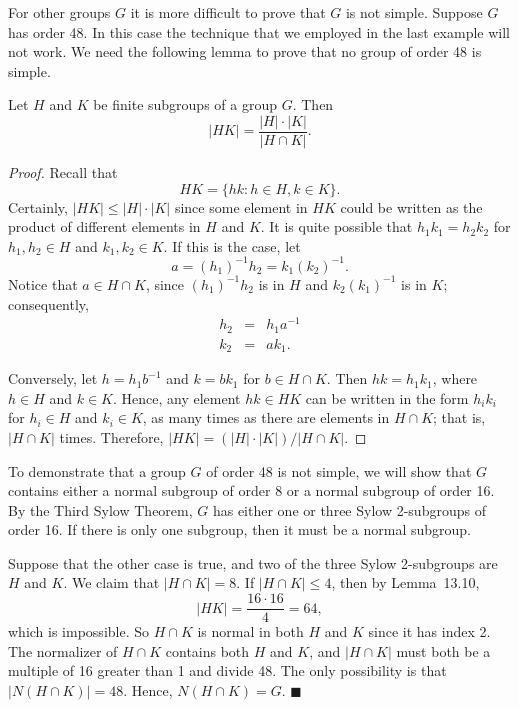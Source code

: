  
\medskip
 
 
For other groups $G$ it is more difficult to prove that $G$ is not
simple. Suppose $G$ has order 48. In this case the technique that we
employed in the last example will not work.  We need the following
lemma to prove that no group of order 48 is simple.  
 
 
\begin{lemma}
Let $H$ and $K$ be finite subgroups of a group $G$. Then
$$
|HK| = \frac{|H| \cdot |K|}{|H \cap K|}.
$$
\end{lemma}
 
 
\begin{proof}
Recall that
$$
HK = \{ hk : h \in H, k \in K \}.
$$
Certainly, $|HK| \leq |H| \cdot |K|$ since some element in $HK$
could be written as the product of different elements in $H$ and $K$.
It is quite possible that $h_1 k_1 = h_2 k_2$ for $h_1, h_2 \in H$ and
$k_1, k_2 \in K$.  If this is the case, let
$$
a = (h_1)^{-1} h_2 = k_1 (k_2)^{-1}.
$$
Notice that $a \in H \cap K$, since $(h_1)^{-1} h_2$ is in $H$ and
$k_2 (k_1)^{-1}$ is in $K$; consequently, 
\begin{eqnarray*}
h_2 & = & h_1 a^{-1} \\
k_2 & = & a k_1.
\end{eqnarray*}
 
 
Conversely, let $h = h_1 b^{-1}$ and $k = b k_1$ for $b \in  H
\cap K$. Then $h k = h_1 k_1$, where $h \in H$ and $k \in K$. Hence,
any element $hk \in HK$ can be written in the form $h_i k_i$ for $h_i
\in H$ and $k_i \in K$, as many times as there are elements in $H
\cap K$; that is, $|H \cap K|$ times. Therefore, $|HK| = (|H| \cdot
|K|)/|H \cap K|$. 
\mbox{\hspace*{1in}}
\end{proof}
 
 
\medskip
 
 
To demonstrate that a group $G$ of order 48 is not simple, we will
show that $G$ contains either a normal subgroup of order 8 or a normal
subgroup of order 16.  By the Third Sylow Theorem, $G$ has either one
or three Sylow 2-subgroups of order 16.  If there is only one
subgroup, then it must be a normal subgroup. 
 
 
Suppose that the other case is true, and two of the three Sylow
2-subgroups are $H$ and $K$. We claim that  $|H \cap K| = 8$.  If $|H
\cap K| \leq 4$, then by Lemma~13.10, 
$$
|HK| = \frac{16 \cdot 16}{4} =64,
$$
which is impossible.  So $H \cap K$ is normal in both $H$ and $K$
since it has index 2. The normalizer of $H \cap K$ contains both $H$
and $K$, and $|H \cap K|$ must both be a multiple of 16 greater than
1 and divide 48. The only possibility is that $|N(H \cap K)|= 48$.
Hence, $N(H \cap K) = G$.
\hspace{\fill} $\blacksquare$
 
